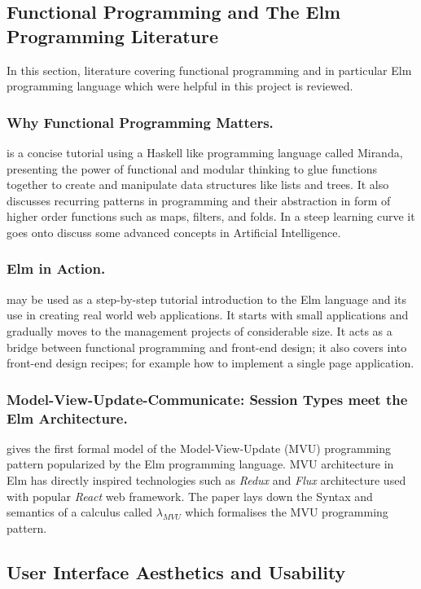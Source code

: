 \subsection{Functional Programming and The Elm Programming Literature}
In this section, literature covering functional programming and in particular
Elm programming language which were helpful in this project is reviewed.

\subsubsection{Why Functional Programming Matters.}
\cite{Hughes89} is a concise tutorial using a Haskell like programming language
called Miranda, presenting the power of functional and modular thinking to glue
functions together to create and manipulate data structures like lists and
trees. It also discusses recurring patterns in programming and their
abstraction in form of higher order functions such as maps, filters, and folds.
In a steep learning curve it goes onto discuss some advanced concepts in
Artificial Intelligence.


\subsubsection{Elm in Action.}
\cite{feldman2020elm} may be used as a step-by-step tutorial introduction to the Elm
language and its use in creating real world web applications. It starts with
small applications and gradually moves to the management projects of
considerable size. It acts as a bridge between functional programming and
front-end design; it also covers into front-end design recipes; for example how
to implement a single page application.

\subsubsection{Model-View-Update-Communicate: Session Types meet the Elm Architecture.}
\cite{FowlerElm} gives the first formal model of the Model-View-Update
(MVU) programming pattern popularized by the Elm programming language. MVU
architecture in Elm has directly inspired technologies such as \emph{Redux} and
\emph{Flux} architecture used with popular \emph{React} web framework. The
paper lays down the Syntax and semantics of a calculus called $\lambda_{MVU}$
which formalises the MVU programming pattern. 


\subsection{User Interface Aesthetics and Usability}
